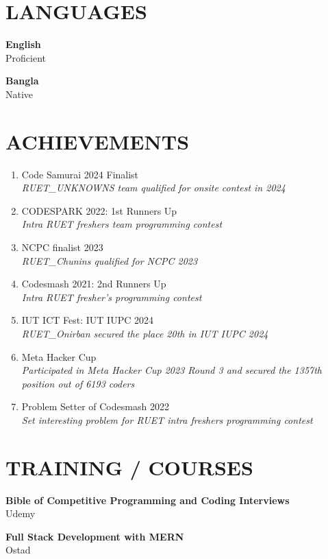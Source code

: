 \documentclass[a4paper,10pt]{article}
\begin{document}
\begin{multicols}{2}
\section*{LANGUAGES}
\textbf{English} \\
Proficient

\textbf{Bangla} \\
Native

\section*{ACHIEVEMENTS}
\begin{enumerate}[noitemsep]
    \item Code Samurai 2024 Finalist \\
    \textit{RUET\_UNKNOWNS team qualified for onsite contest in 2024}
    \item CODESPARK 2022: 1st Runners Up \\
    \textit{Intra RUET freshers team programming contest}
    \item NCPC finalist 2023 \\
    \textit{RUET\_Chunins qualified for NCPC 2023}
    \item Codesmash 2021: 2nd Runners Up \\
    \textit{Intra RUET fresher’s programming contest}
    \item IUT ICT Fest: IUT IUPC 2024 \\
    \textit{RUET\_Onirban secured the place 20th in IUT IUPC 2024}
    \item Meta Hacker Cup \\
    \textit{Participated in Meta Hacker Cup 2023 Round 3 and secured the 1357th position out of 6193 coders}
    \item Problem Setter of Codesmash 2022 \\
    \textit{Set interesting problem for RUET intra freshers programming contest}
\end{enumerate}

\section*{TRAINING / COURSES}
\textbf{Bible of Competitive Programming and Coding Interviews} \\
Udemy

\textbf{Full Stack Development with MERN} \\
Ostad


\end{multicols}
\end{document}
